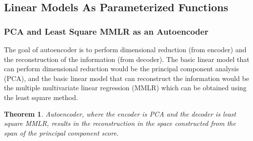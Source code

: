 \documentclass[12pt]{article}
\newtheorem{theorem}{Theorem}
\begin{document}
\subsection{Linear Models As Parameterized Functions}
\subsubsection{PCA and Least Square MMLR as an Autoencoder}

The goal of autoencoder is to perform dimensional reduction (from encoder) and the reconstruction of the information (from decoder). The basic linear model that can perform dimensional reduction would be the principal component analysis (PCA), and the basic linear model that can reconstruct the information would be the multiple multivariate linear regression (MMLR) which can be obtained using the least square method.
\begin{theorem}\label{thm:1}
Autoencoder, where the encoder is PCA and the decoder is least square MMLR, results in the reconstruction in the space constructed from the span of the principal component score.
\end{theorem}
\end{document}
